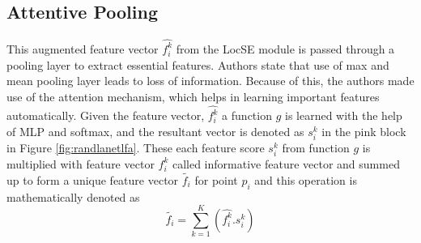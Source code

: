 \subsection{Attentive Pooling}
This augmented feature vector $\hat{f_i^k}$ from the LocSE module is passed through a pooling layer to extract essential features.
Authors state that use of max and mean pooling layer leads to loss of information. Because of this, the authors made use of the attention mechanism, which helps in learning important features automatically.
Given the feature vector, $\hat{f_i^k}$ a function $g$ is learned with the help of MLP and softmax, and the resultant vector is denoted as $s_i^k$ in the pink block in Figure \ref{fig:randlanetlfa}.
These each feature score $s_i^k$ from function $g$ is multiplied with feature vector $f_i^k$ called informative feature vector and summed up to form a unique feature vector $\tilde{f_i}$ for point $p_i$ and this operation is mathematically denoted as
$$
\tilde{f_i}= \sum_{k=1}^K (\hat{f_i^k}.s_i^k)
$$

